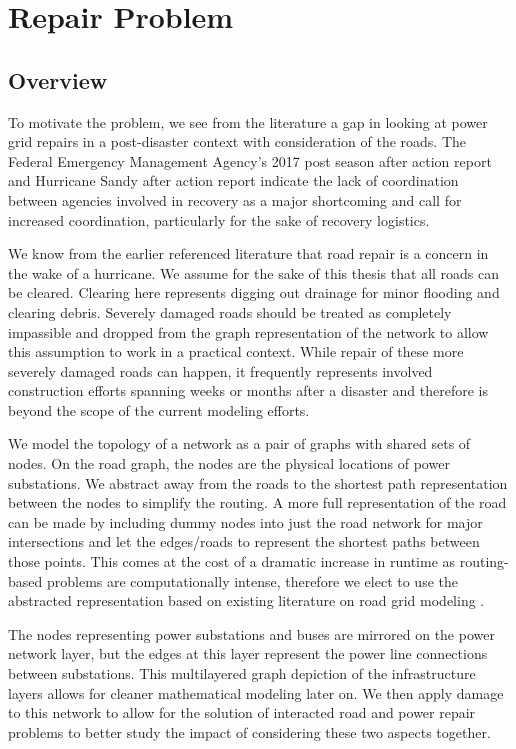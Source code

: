 \documentclass{article}
\begin{document}
	
	\section{Repair Problem}
	
	\subsection{Overview}
	To motivate the problem, we see from the literature a gap in looking at power grid repairs in a post-disaster context with consideration of the roads. The Federal Emergency Management Agency's 2017 post season after action report \cite{FEMA2017AAR}  and Hurricane Sandy after action report \cite{FEMASandyAAR} indicate the lack of coordination between agencies involved in recovery as a major shortcoming and call for increased coordination, particularly for the sake of recovery logistics.
	
	We know from the earlier referenced literature that road repair is a concern in the wake of a hurricane. We assume for the sake of this thesis that all roads can be cleared. Clearing here represents digging out drainage for minor flooding and clearing debris. Severely damaged roads should be treated as completely impassible and dropped from the graph representation of the network to allow this assumption to work in a practical context. While repair of these more severely damaged roads can happen, it frequently represents involved construction efforts spanning weeks or months after a disaster and therefore is beyond the scope of the current modeling efforts.
	
	We model the topology of a network as a pair of graphs with shared sets of nodes. On the road graph, the nodes are the physical locations of power substations. We abstract away from the roads to the shortest path representation between the nodes to simplify the routing. A more full representation of the road can be made by including dummy nodes into just the road network for major intersections and let the edges/roads to represent the shortest paths between those points. This comes at the cost of a dramatic increase in runtime as routing-based problems are computationally intense, therefore we elect to use the abstracted representation based on existing literature on road grid modeling \cite{LammerEA2006}. 
	
	The nodes representing power substations and buses are mirrored on the power network layer, but the edges at this layer represent the power line connections between substations. This multilayered graph depiction of the infrastructure layers allows for cleaner mathematical modeling later on. We then apply damage to this network to allow for the solution of interacted road and power repair problems to better study the impact of considering these two aspects together.
		
\end{document}
